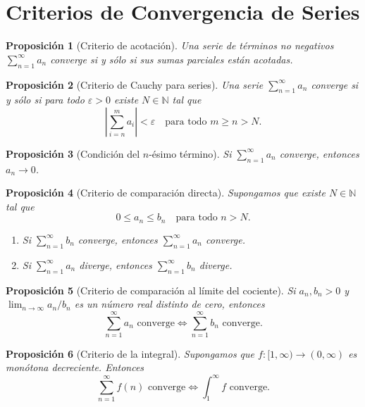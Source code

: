 \documentclass{article}
\newtheorem{proposicion}{Proposición}
\begin{document}
\section*{Criterios de Convergencia de Series}

\begin{proposicion}[Criterio de acotación]
Una serie de términos no negativos $\sum_{n=1}^{\infty} a_n$ converge si y sólo si
sus sumas parciales están acotadas.
\end{proposicion}

\begin{proposicion}[Criterio de Cauchy para series]
Una serie $\sum_{n=1}^{\infty} a_n$ converge si y sólo si para todo $\varepsilon > 0$
existe $N \in \mathbb{N}$ tal que
\[
  \left|\sum_{i=n}^{m} a_i\right| < \varepsilon
  \quad \text{para todo } m \geq n > N.
\]
\end{proposicion}

\begin{proposicion}[Condición del $n$-ésimo término]
Si $\sum_{n=1}^{\infty} a_n$ converge, entonces $a_n \to 0$.
\end{proposicion}

\begin{proposicion}[Criterio de comparación directa]
Supongamos que existe $N \in \mathbb{N}$ tal que
\[
  0 \leq a_n \leq b_n \quad \text{para todo } n > N.
\]
\begin{enumerate}
  \item[(a)] Si $\sum_{n=1}^{\infty} b_n$ converge, entonces $\sum_{n=1}^{\infty} a_n$ converge.
  \item[(b)] Si $\sum_{n=1}^{\infty} a_n$ diverge, entonces $\sum_{n=1}^{\infty} b_n$ diverge.
\end{enumerate}
\end{proposicion}

\begin{proposicion}[Criterio de comparación al límite del cociente]
Si $a_n, b_n > 0$ y $\lim_{n\to\infty} a_n/b_n$ es un número real distinto de cero,
entonces
\[
  \sum_{n=1}^{\infty} a_n \text{ converge} \iff \sum_{n=1}^{\infty} b_n \text{ converge}.
\]
\end{proposicion}

\begin{proposicion}[Criterio de la integral]
Supongamos que $f:[1,\infty)\to(0,\infty)$ es monótona decreciente. Entonces
\[
  \sum_{n=1}^{\infty} f(n) \text{ converge} \iff \int_1^{\infty} f \text{ converge}.
\]
\end{proposicion}
\end{document}
